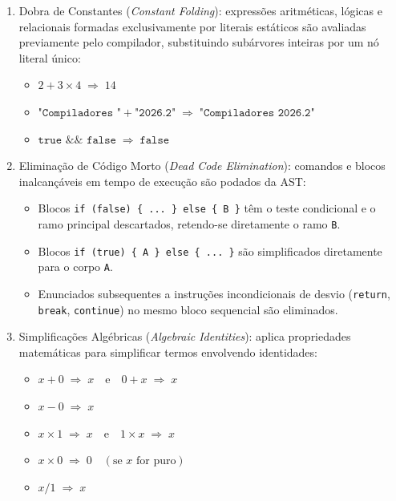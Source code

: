 \begin{enumerate}
    \item Dobra de Constantes (\textit{Constant Folding}):
    expressões aritméticas, lógicas e relacionais formadas exclusivamente por literais estáticos são avaliadas previamente pelo compilador, substituindo subárvores inteiras por um nó literal único:
    \begin{itemize}
        \item $2 + 3 \times 4 \;\Longrightarrow\; 14$
        \item $\texttt{"Compiladores "} + \texttt{"2026.2"} \;\Longrightarrow\; \texttt{"Compiladores 2026.2"}$
        \item $\texttt{true } \&\& \texttt{ false} \;\Longrightarrow\; \texttt{false}$
    \end{itemize}

    \item Eliminação de Código Morto (\textit{Dead Code Elimination}):
    comandos e blocos inalcançáveis em tempo de execução são podados da AST:
    \begin{itemize}
        \item Blocos \texttt{if (false) \{ ... \} else \{ B \}} têm o teste condicional e o ramo principal descartados, retendo-se diretamente o ramo \texttt{B}.
        \item Blocos \texttt{if (true) \{ A \} else \{ ... \}} são simplificados diretamente para o corpo \texttt{A}.
        \item Enunciados subsequentes a instruções incondicionais de desvio (\texttt{return}, \texttt{break}, \texttt{continue}) no mesmo bloco sequencial são eliminados.
    \end{itemize}

    \item Simplificações Algébricas (\textit{Algebraic Identities}):
    aplica propriedades matemáticas para simplificar termos envolvendo identidades:
    \begin{itemize}
        \item $x + 0 \;\Longrightarrow\; x \quad\text{e}\quad 0 + x \;\Longrightarrow\; x$
        \item $x - 0 \;\Longrightarrow\; x$
        \item $x \times 1 \;\Longrightarrow\; x \quad\text{e}\quad 1 \times x \;\Longrightarrow\; x$
        \item $x \times 0 \;\Longrightarrow\; 0 \quad (\text{se } x \text{ for puro})$
        \item $x / 1 \;\Longrightarrow\; x$
    \end{itemize}
\end{enumerate}

